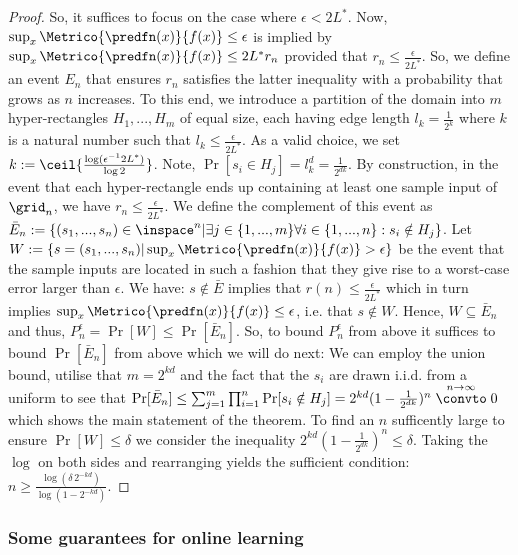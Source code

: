 \begin{thm}
\begin{proof}
So, it suffices to focus on the case where $\epsilon < 2 L^*$. Now, $\sup_x \Metrico{\predfn(x)}{f(x)} \leq \epsilon  $ is implied by $\sup_x \Metrico{\predfn(x)}{f(x)} \leq 2 L^* r_n $ provided that $  r_n  \leq \frac {\epsilon}{2 L^*}$. So, we define an event $E_n$ that ensures $r_n$ satisfies the latter inequality with a probability that grows as $n$ increases.
To this end, we introduce a partition of the domain into $m$ hyper-rectangles $H_1,...,H_m$ of equal size, each having edge length $l_k=\frac 1 {2^k}$ where $k$ is a natural number such that $l_k \leq  \frac {\epsilon}{2 L^*} $. As a valid choice, we set $k:= \ceil{\frac{\log(\epsilon^{-1}2 L^*)}{\log 2}}$. Note, $\Pr[s_i \in H_j] = l_k^d = \frac{1}{2^{dk}}$.  By construction, in the event that each hyper-rectangle ends up containing at least one sample input of $\grid_n$, we have  $r_n \leq \frac {\epsilon}{2 L^*}$. 
We define the complement of this event as $\bar E_n := \{(s_1,...,s_n)  \in \inspace^n | \exists j \in \{1,...,m\} \forall i \in \{1,...,n\}: s_i \notin H_j  \}$. Let  $W:= \{ s=(s_1,...,s_n)  | \sup_x \Metrico{\predfn(x)}{f(x)} > \epsilon \}$ be the event that the sample inputs are located in such a fashion that they give rise to a worst-case error larger than $\epsilon$.  We have: $s \notin \bar E$ implies that $r(n) \leq \frac {\epsilon}{2 L^*} $ which in turn implies $\sup_x \Metrico{\predfn(x)}{f(x)} \leq \epsilon $, i.e. that $s \notin W$. Hence, $W \subseteq \bar E_n$ and thus, $ P_n^\epsilon =\Pr[W] \leq \Pr[\bar E_n]$.
So, to bound $P_n^\epsilon$ from above it suffices to bound $\Pr[\bar E_n]$ from above which we will do next: We can employ the union bound, utilise that $m = 2^{kd}$ and the fact that the $s_i$ are drawn i.i.d. from a uniform to see that $\Pr[\bar E_n] \leq \sum_{j=1}^m \prod_{i=1}^n \Pr[s_i \notin H_j] = 2^{kd}  (1-\frac{1}{2^{dk}})^n \stackrel{n \to \infty}{\convto} 0$ which shows the main statement of the theorem. To find an $n$ sufficently large to ensure $\Pr[W] \leq \delta$ we consider the inequality $2^{kd}  (1-\frac{1}{2^{dk}})^n \leq \delta$. Taking the $\log$ on both sides and rearranging yields the sufficient condition: $n \geq \frac{ \log(\delta \, 2^{-kd}  )}{\log(1- 2^{-kd})}$. 
\end{proof}
\end{thm}



\subsubsection{Some guarantees for online learning}


